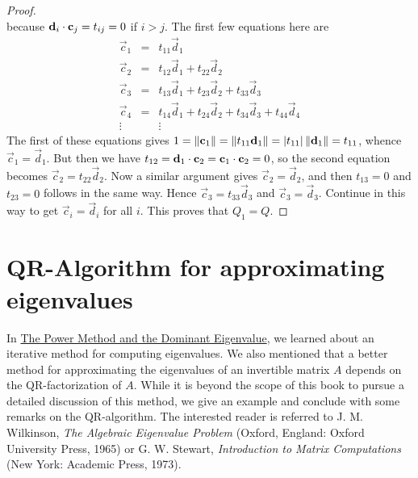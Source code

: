 \documentclass{ximera}
\begin{document}
\begin{proof}
\begin{equation*}
\end{equation*}
because $\mathbf{d}_{i} \cdot \mathbf{c}_{j} = t_{ij} = 0$ if $i > j$. The first few equations here are
\begin{equation*}
\begin{array}{ccl}
\vec{c}_{1} &=& t_{11}\vec{d}_{1} \\
\vec{c}_{2} &=& t_{12}\vec{d}_{1} + t_{22}\vec{d}_{2} \\
\vec{c}_{3} &=& t_{13}\vec{d}_{1} + t_{23}\vec{d}_{2} + t_{33}\vec{d}_{3} \\
\vec{c}_{4} &=& t_{14}\vec{d}_{1} + t_{24}\vec{d}_{2} + t_{34}\vec{d}_{3} + t_{44}\vec{d}_{4} \\
\vdots && \vdots
\end{array}
\end{equation*}
The first of these equations gives $1 = \left\lVert \mathbf{c}_{1} \right\rVert = \left\lVert t_{11}\mathbf{d}_{1} \right\rVert = | t_{11} | \left\lVert \mathbf{d}_{1} \right\rVert = t_{11}$, whence $\vec{c}_{1} = \vec{d}_{1}$. But then we have $t_{12} = \mathbf{d}_{1} \cdot \mathbf{c}_{2} = \mathbf{c}_{1} \cdot \mathbf{c}_{2} = 0$, so the second equation becomes $\vec{c}_{2} = t_{22}\vec{d}_{2}$. Now a similar argument gives $\vec{c}_{2} = \vec{d}_{2}$, and then $t_{13} = 0$ and $t_{23} = 0$ follows in the same way. Hence $\vec{c}_{3} = t_{33}\vec{d}_{3}$ and $\vec{c}_{3} = \vec{d}_{3}$. Continue in this way to get $\vec{c}_{i} = \vec{d}_{i}$ for all $i$. This proves that $Q_{1} = Q$.
\end{proof}

\section*{QR-Algorithm for approximating eigenvalues}\label{sec:QRalgorithm}

In \href{}{The Power Method and the Dominant Eigenvalue}, we learned about an iterative method for computing eigenvalues.  We also mentioned that a better method for approximating the eigenvalues of an invertible matrix $A$ depends on the QR-factorization of $A$.  While it is beyond the scope of this book to pursue a detailed discussion of this method, we give an example and conclude with some remarks on the QR-algorithm. The interested reader is referred to
 J. M. Wilkinson, \textit{The Algebraic Eigenvalue Problem} (Oxford, England: Oxford University Press, 1965) or G. W. Stewart, \textit{Introduction to Matrix Computations} (New York: Academic Press, 1973).
\end{document}
